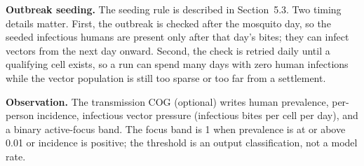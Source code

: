 \documentclass[11pt,a4paper]{article}
\begin{document}
\textbf{Outbreak seeding.} The seeding rule is described in
Section~5.3. Two timing details matter. First, the outbreak is checked
after the mosquito day, so the seeded infectious humans are present only
after that day's bites; they can infect vectors from the next day onward.
Second, the check is retried daily until a qualifying cell exists, so a
run can spend many days with zero human infections while the vector
population is still too sparse or too far from a settlement.

\textbf{Observation.} The transmission COG (optional) writes human
prevalence, per-person incidence, infectious vector pressure (infectious
bites per cell per day), and a binary active-focus band. The focus band is
1 when prevalence is at or above 0.01 or incidence is positive; the
threshold is an output classification, not a model rate.
\end{document}
